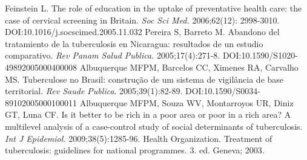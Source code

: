\begin{multicols}{2}
\begin{biblio}[REFERENCES]
\allowbreak{} Feinstein L.\allowbreak{} The role of education in the uptake of preventative health care:\allowbreak{} the case of cervical screening in Britain.\allowbreak{} \textit{Soc Sci Med.\allowbreak{} }2006;62(\allowbreak{}12)\allowbreak{}:\allowbreak{} 2998-\allowbreak{}3010.\allowbreak{} DOI:\allowbreak{}10.\allowbreak{}1016\fshyp{}j.\allowbreak{}socscimed.\allowbreak{}2005.\allowbreak{}11.\allowbreak{}032
\allowbreak{} Pereira S,\allowbreak{} Barreto M.\allowbreak{} Abandono del tratamiento de la tuberculosis en Nicaragua:\allowbreak{} resultados de un estudio comparativo.\allowbreak{} \textit{Rev Panam Salud Publica.\allowbreak{} }2005;17(\allowbreak{}4)\allowbreak{}:\allowbreak{}271-\allowbreak{}8.\allowbreak{} DOI:\allowbreak{}10.\allowbreak{}1590\fshyp{}S1020-\allowbreak{}49892005000400008
\allowbreak{} Albuquerque MFPM,\allowbreak{} Barcelos CC,\allowbreak{} Ximenes RA,\allowbreak{} Carvalho MS.\allowbreak{} Tuberculose no Brasil:\allowbreak{} construção de um sistema de vigilância de base territorial.\allowbreak{} \textit{Rev Saude Publica}.\allowbreak{} 2005;39(\allowbreak{}1)\allowbreak{}:\allowbreak{}82-\allowbreak{}89.\allowbreak{} DOI:\allowbreak{}10.\allowbreak{}1590\fshyp{}S0034-\allowbreak{}89102005000100011
\allowbreak{} Albuquerque MFPM,\allowbreak{} Souza WV,\allowbreak{} Montarroyos UR,\allowbreak{} Diniz GT,\allowbreak{} Luna CF.\allowbreak{} Is it better to be rich in a poor area or poor in a rich area? A multilevel analysis of a case-\allowbreak{}control study of social determinants of tuberculosis.\allowbreak{} \textit{Int J Epidemiol.\allowbreak{}} 2009;38(\allowbreak{}5)\allowbreak{}:\allowbreak{}1285-\allowbreak{}96.\allowbreak{}
Health Organization.\allowbreak{} Treatment of tuberculosis:\allowbreak{} guidelines for national programmes.\allowbreak{} 3.\allowbreak{} ed.\allowbreak{} Geneva; 2003.\allowbreak{}
\end{biblio}

\end{multicols}

